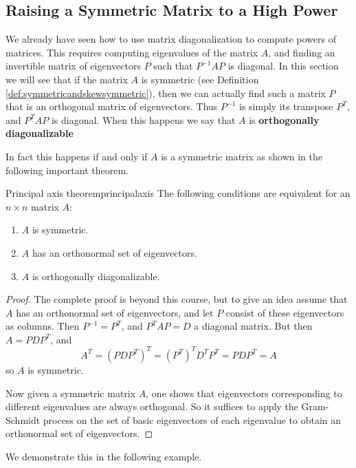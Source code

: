 \subsection{Raising a Symmetric Matrix to a High Power}

We already have seen how to use matrix diagonalization to compute
powers of matrices. This requires computing eigenvalues of the matrix
$A$, and finding an invertible matrix of eigenvectors $P$ such that
$P^{-1}AP$ is diagonal. In this section we will see that if the matrix
$A$ is symmetric (see Definition \ref{def:symmetricandskewsymmetric}),
then we can actually find such a matrix $P$ that is an orthogonal
matrix of eigenvectors. Thus $P^{-1}$ is simply its transpose
$P^T$, and $P^TAP$ is diagonal. When this happens we say that $A$ is
\textbf{orthogonally diagonalizable}

In fact this happens if and only if $A$ is a symmetric matrix as
shown in the following important theorem.

\begin{theorem}{Principal axis theorem}{principalaxis}
The following conditions are equivalent for an $n \times n$ matrix $A$:
\begin{enumerate}
\item $A$ is symmetric. 
\item $A$ has an orthonormal set of eigenvectors. 
\item $A$ is  orthogonally diagonalizable.
\end{enumerate}
\end{theorem}

\begin{proof}
The complete proof is beyond this course, but to give an idea assume
that $A$ has an orthonormal set of eigenvectors, and let $P$ consist
of these eigenvectors as columns. Then $P^{-1}=P^T$, and $P^TAP=D$ a diagonal matrix. But then $A=PDP^T$, and
\[ A^T=(PDP^T)^T = (P^T)^TD^TP^T=PDP^T=A\]
so $A$ is symmetric. 

Now given a symmetric matrix $A$, one shows that eigenvectors
corresponding to different eigenvalues are always orthogonal. So it
suffices to apply the Gram-Schmidt process on the set of basic
eigenvectors of each eigenvalue to obtain an orthonormal set of eigenvectors. 
\end{proof}

We demonstrate this in the following example. 


